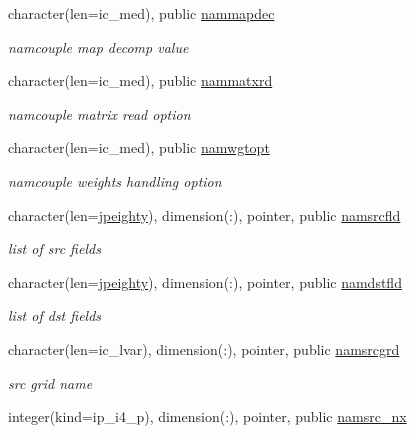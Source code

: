 \begin{DoxyCompactItemize}
character(len=ic\+\_\+med), public \hyperlink{namespacemod__oasis__namcouple_a484aaf8a6d7eaa0675a8249fa94509cf}{nammapdec}
\begin{DoxyCompactList}\small\item\em namcouple map decomp value \end{DoxyCompactList}\item 
character(len=ic\+\_\+med), public \hyperlink{namespacemod__oasis__namcouple_ad9ac6585de157a05d793636addf672a5}{nammatxrd}
\begin{DoxyCompactList}\small\item\em namcouple matrix read option \end{DoxyCompactList}\item 
character(len=ic\+\_\+med), public \hyperlink{namespacemod__oasis__namcouple_a03a63fe10e98e695e556ee190cd3accc}{namwgtopt}
\begin{DoxyCompactList}\small\item\em namcouple weights handling option \end{DoxyCompactList}\item 
character(len=\hyperlink{namespacemod__oasis__namcouple_a4fb10ad6e864dcbe34c4a8b02204a523}{jpeighty}), dimension(\+:), pointer, public \hyperlink{namespacemod__oasis__namcouple_a5fcb5a4f2a49f414fafe38b03c5c089d}{namsrcfld}
\begin{DoxyCompactList}\small\item\em list of src fields \end{DoxyCompactList}\item 
character(len=\hyperlink{namespacemod__oasis__namcouple_a4fb10ad6e864dcbe34c4a8b02204a523}{jpeighty}), dimension(\+:), pointer, public \hyperlink{namespacemod__oasis__namcouple_ac4cfec209e4169b6098f9a8b9be1ffb1}{namdstfld}
\begin{DoxyCompactList}\small\item\em list of dst fields \end{DoxyCompactList}\item 
character(len=ic\+\_\+lvar), dimension(\+:), pointer, public \hyperlink{namespacemod__oasis__namcouple_a589c1bae58b10bcb0cfb30c0893a7895}{namsrcgrd}
\begin{DoxyCompactList}\small\item\em src grid name \end{DoxyCompactList}\item 
integer(kind=ip\+\_\+i4\+\_\+p), dimension(\+:), pointer, public \hyperlink{namespacemod__oasis__namcouple_ac8f6c8fe3720739f3d26431a8a600506}{namsrc\+\_\+nx}

\end{DoxyCompactItemize}
